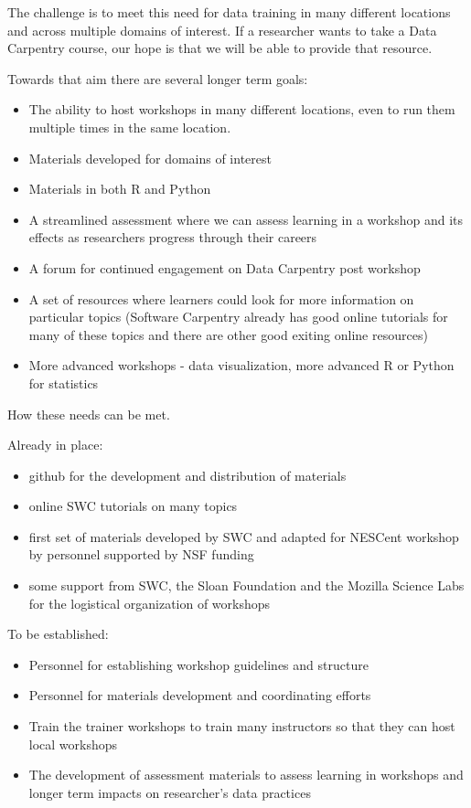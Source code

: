 \documentclass[11pt]{article}
\begin{document}
The challenge is to meet this need for data training in many different locations and across multiple domains of interest.
 If a researcher wants to take a Data Carpentry course, our hope is that we will be able to provide that resource. 
 
Towards that aim there are several longer term goals:

\begin{itemize}
\item The ability to host workshops in many different locations, even to run
them multiple times in the same location. 
\item Materials developed for domains of interest 
\item Materials in both R and Python 
\item A streamlined assessment where we can assess learning in a workshop and its effects
as researchers progress through their careers
\item A forum for continued engagement on Data Carpentry post workshop
\item A set of resources where learners could look for more information on particular topics
(Software Carpentry already has good online tutorials for many of these topics and there are other good exiting online resources)
\item More advanced workshops - data visualization, more advanced R or Python for statistics
\end{itemize}


How these needs can be met.

Already in place:
\begin{itemize}
\item github for the development and distribution of materials
\item online SWC tutorials on many topics
\item first set of materials developed by SWC and adapted for NESCent workshop by personnel supported by NSF funding
\item some support from SWC, the Sloan Foundation and the Mozilla Science Labs for the logistical organization of workshops
\end{itemize}

To be established:
\begin{itemize}
\item Personnel for establishing workshop guidelines and structure
\item Personnel for materials development and coordinating efforts
\item Train the trainer workshops to train many instructors so that they can host local
workshops
\item The development of assessment materials to assess learning in workshops and longer term impacts on 
researcher's data practices
\end{itemize}
\end{document}
